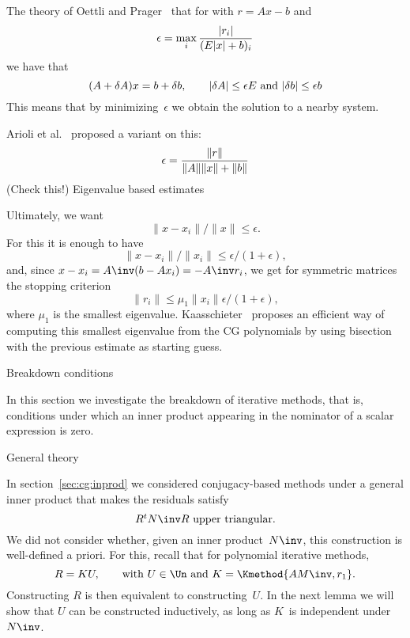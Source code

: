 \documentclass[11pt]{artikel3}
\begin{document}
\begin{Outline}
The theory of Oettli and Prager~\cite{OettliPrager:compatibility} that
for with $r=Ax-b$ and
\[ \epsilon=\max_i{|r_i|\over (E|x|+b)_i} \]
we have that
\[ (A+\delta A)x=b+\delta b,\qquad 
    \hbox{$|\delta A|\leq\epsilon E$ and $|\delta b|\leq\epsilon b$}
\]
This means that by minimizing~$\epsilon$ we obtain the solution to a
nearby system.

Arioli et al.~\cite{ArDuRu:stopping} proposed a variant on this:
\[ \epsilon={\|r\|\over \|A\|\|x\|+\|b\|} \]
(Check this!)
 {Eigenvalue based estimates}

Ultimately, we want
\[ \|x-x_i\|/\|x\|\leq\epsilon. \]
For this it is enough to have
\[ \|x-x_i\|/\|x_i\|\leq\epsilon/(1+\epsilon), \]
and, since $x-x_i=A\inv(b-Ax_i)=-A\inv r_i$, we get for symmetric
matrices the stopping criterion
\[ \|r_i\|\leq\mu_1\|x_i\|\epsilon/(1+\epsilon), \]
where $\mu_1$ is the smallest
eigenvalue. Kaasschieter~\cite{Kaas:termination} proposes an efficient
way of computing this smallest eigenvalue from the CG polynomials by
using bisection with the previous estimate as starting guess.

 {Breakdown conditions}
\label{sec:breakdown}

In this section we investigate the breakdown of iterative methods,
that is, conditions under which an inner product appearing
in the nominator of a scalar expression is zero.

 {General theory}

In section~\ref{sec:cg:inprod} we considered conjugacy-based methods
under a general inner product that makes the residuals satisfy
\[ \hbox{$R^tN\inv R$ upper triangular.} \]
We did not consider whether, given an inner product~$N\inv$,
this construction is well-defined a priori.
For this, recall that for polynomial iterative methods,
\[ R=KU, \qquad\hbox{with $U\in\Un$ and $K=\Kmethod{AM\inv,r_1}$}. \]
Constructing $R$ is then equivalent to constructing~$U$.
In the next lemma we will show that $U$ can be constructed inductively,
as long as $K$~is independent under~$N\inv$.


\end{Outline}
\end{document}
